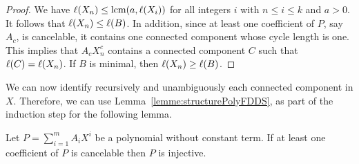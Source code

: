	\begin{proof}
	        We have $\ell(X_n) \le \operatorname{lcm}(a, \ell(X_{i}))$ for all integers $i$ with $n \le i \le k$ and $a > 0$. 
		It follows that $\ell(X_n) \le \ell(B)$. 
		In addition, since at least one coefficient of $P$, say $A_{c}$, is cancelable, it contains one connected component whose cycle length is one. 
		This implies that $A_{c} X_{n}^c$ contains a connected component $C$ such that $\ell(C) = \ell(X_n)$. 
		If $B$ is minimal, then $\ell(X_n) \ge \ell(B)$.
	\end{proof}
	
	We can now identify recursively and unambiguously each connected component in $X$. 
	Therefore, we can use Lemma~\ref{lemme:structurePolyFDDS}, as part of the induction step for the following lemma.
	
	\begin{lemma}\label{lemme:condSufInjSpe}
		Let $P = \sum_{i=1}^{m} A_i X^{i}$ be a polynomial without constant term.
		If at least one coefficient of $P$ is cancelable then $P$ is injective.
	\end{lemma}
	
